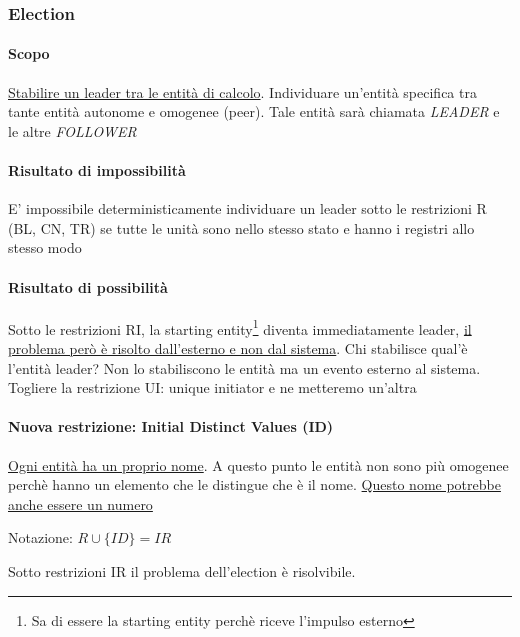 \subsubsection{Election}

\paragraph{Scopo} \uline{Stabilire un leader tra le entità di calcolo}. Individuare un'entità specifica tra tante entità autonome e omogenee (peer). Tale entità sarà chiamata \textit{LEADER} e le altre \textit{FOLLOWER}

\paragraph{Risultato di impossibilità}
E' impossibile deterministicamente individuare un leader sotto le restrizioni R (BL, CN, TR) se tutte le unità sono nello stesso stato e hanno i registri allo stesso modo

\paragraph{Risultato di possibilità}
Sotto le restrizioni RI, la starting entity\footnote{Sa di essere la starting entity perchè riceve l'impulso esterno} diventa immediatamente leader, \uline{il problema però è risolto dall'esterno e non dal sistema}. Chi stabilisce qual'è l'entità leader? Non lo stabiliscono le entità ma un evento esterno al sistema. Togliere la restrizione UI: unique initiator e ne metteremo un'altra

\paragraph{Nuova restrizione: Initial Distinct Values (ID)}
\uline{Ogni entità ha un proprio nome}. A questo punto le entità non sono più omogenee perchè hanno un elemento che le distingue che è il nome. \uline{Questo nome potrebbe anche essere un numero} 

Notazione: $R \cup \{ID\} = IR$

Sotto restrizioni IR il problema dell'election è risolvibile.

